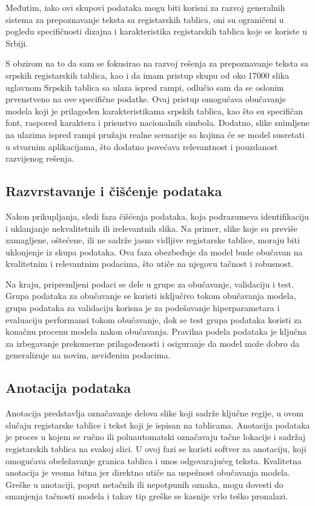 \documentclass[a4paper,12pt]{article}
\begin{document}
	Međutim, iako ovi skupovi podataka mogu biti korisni za razvoj generalnih sistema za prepoznavanje teksta sa registarskih tablica, oni su ograničeni u pogledu specifičnosti dizajna i karakteristika registarskih tablica koje se koriste u Srbiji.
	
	S obzirom na to da sam se fokusirao na razvoj rešenja za prepoznavanje teksta sa srpskih registarskih tablica, kao i da imam pristup skupu od oko 17000 slika uglavnom Srpskih tablica sa ulaza ispred rampi, odlučio sam da se oslonim prvenstveno na ove specifične podatke. Ovaj pristup omogućava obučavanje modela koji je prilagođen karakteristikama srpskih tablica, kao što su specifičan font, raspored karaktera i prisustvo nacionalnih simbola. Dodatno, slike snimljene na ulazima ispred rampi pružaju realne scenarije sa kojima će se model susretati u stvarnim aplikacijama, što dodatno povećava relevantnost i pouzdanost razvijenog rešenja.
	
	\subsection{Razvrstavanje i čišćenje podataka}
	Nakon prikupljanja, sledi faza čišćenja podataka, koja podrazumeva identifikaciju i uklanjanje nekvalitetnih ili irelevantnih slika. Na primer, slike koje su previše zamagljene, oštećene, ili ne sadrže jasno vidljive registarske tablice, moraju biti uklonjenje iz skupa podataka. Ova faza obezbeđuje da model bude obučavan na kvalitetnim i relevantnim podacima, što utiče na njegovu tačnost i robusnost.
	
	Na kraju, pripremljeni podaci se dele u grupe za obučavanje, validaciju i test. Grupa podataka za obučavanje se koristi isključivo tokom obučavanja modela, grupa podataka za validaciju korisna je za podešavanje hiperparametara i evaluaciju performansi tokom obučavanje, dok se test grupa podataka koristi za konačnu procenu modela nakon obučavanja. Pravilna podela podataka je ključna za izbegavanje prekomerne prilagođenosti i osiguranje da model može dobro da generalizuje na novim, neviđenim podacima.
	
	\subsection{Anotacija podataka}
	Anotacija predstavlja označavanje delova slike koji sadrže ključne regije, u ovom slučaju registarske tablice i tekst koji je ispisan na tablicama. Anotacija podataka je proces u kojem se ručno ili poluautomatski označavaju tačne lokacije i sadržaj registarskih tablica na svakoj slici. U ovoj fazi se koristi softver za anotaciju, koji omogućava obeležavanje granica tablica i unos odgovarajućeg teksta. Kvalitetna anotacija je veoma bitna jer direktno utiče na uspešnost obučavanja modela. Greške u anotaciji, poput netačnih ili nepotpunih oznaka, mogu dovesti do smanjenja tačnosti modela i takav tip greške se kasnije vrlo teško pronalazi.
	
\end{document}
